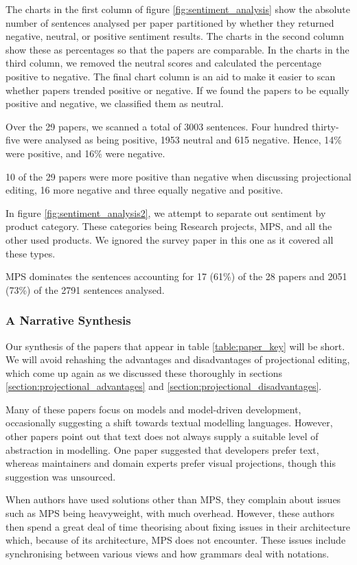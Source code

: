 The charts in the first column of figure \ref{fig:sentiment_analysis} show the absolute number of sentences analysed per paper partitioned by whether they returned negative, neutral, or positive sentiment results.
The charts in the second column show these as percentages so that the papers are comparable.
In the charts in the third column, we removed the neutral scores and calculated the percentage positive to negative.
The final chart column is an aid to make it easier to scan whether papers trended positive or negative.
If we found the papers to be equally positive and negative, we classified them as neutral.

Over the 29 papers, we scanned a total of 3003 sentences.
Four hundred thirty-five were analysed as being positive, 1953 neutral and 615 negative.
Hence, 14\% were positive, and 16\% were negative.

10 of the 29 papers were more positive than negative when discussing projectional editing, 16 more negative and three equally negative and positive.

In figure \ref{fig:sentiment_analysis2}, we attempt to separate out sentiment by product category.  
These categories being Research projects, MPS, and all the other used products.
We ignored the survey paper in this one as it covered all these types.

MPS dominates the sentences accounting for 17 (61\%) of the 28 papers and 2051 (73\%) of the 2791 sentences analysed.

\subsubsection{A Narrative Synthesis}
Our synthesis of the papers that appear in table \ref{table:paper_key} will be short.
We will avoid rehashing the advantages and disadvantages of projectional editing, which come up again as we discussed these thoroughly in sections \ref{section:projectional_advantages} and \ref{section:projectional_disadvantages}.

Many of these papers focus on models and model-driven development, occasionally suggesting a shift towards textual modelling languages.
However, other papers point out that text does not always supply a suitable level of abstraction in modelling.
One paper suggested that developers prefer text, whereas maintainers and domain experts prefer visual projections, though this suggestion was unsourced.

When authors have used solutions other than MPS, they complain about issues such as MPS being heavyweight, with much overhead.
However, these authors then spend a great deal of time theorising about fixing issues in their architecture which, because of its architecture, MPS does not encounter.
These issues include synchronising between various views and how grammars deal with notations.

